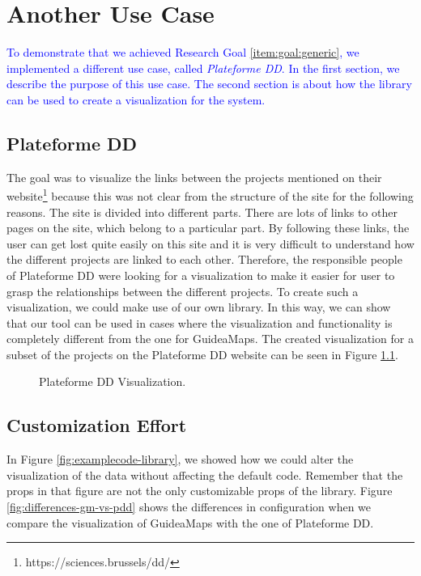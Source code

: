 \chapter{Another Use Case}\label{ch:usecase}
\textcolor{blue}{To demonstrate that we achieved Research Goal \ref{item:goal:generic}, we implemented a different use case, called \textit{Plateforme DD}. In the first section, we describe the purpose of this use case. The second section is about how the library can be used to create a visualization for the system.}

\section{Plateforme DD}\label{sec:pdd}
The goal was to visualize the links between the projects mentioned on their website\footnote{https://sciences.brussels/dd/} because this was not clear from the structure of the site for the following reasons. The site is divided into different parts. There are lots of links to other pages on the site, which belong to a particular part. By following these links, the user can get lost quite easily on this site and it is very difficult to understand how the different projects are linked to each other. Therefore, the responsible people of Plateforme DD were looking for a visualization to make it easier for user to grasp the relationships between the different projects. To create such a visualization, we could make use of our own library. In this way, we can show that our tool can be used in cases where the visualization and functionality is completely different from the one for GuideaMaps. The created visualization for a subset of the projects on the Plateforme DD website can be seen in Figure \ref{fig:plateforme-dd}.\\

\begin{figure}[H]
	\centering
	\caption{Plateforme DD Visualization.}
	\label{fig:plateforme-dd}
\end{figure}



\section{Customization Effort}\label{sec:customization-effort}
In Figure \ref{fig:examplecode-library}, we showed how we could alter the visualization of the data without affecting the default code. Remember that the props in that figure are not the only customizable props of the library. Figure \ref{fig:differences-gm-vs-pdd} shows the differences in configuration when we compare the visualization of GuideaMaps with the one of Plateforme DD.

